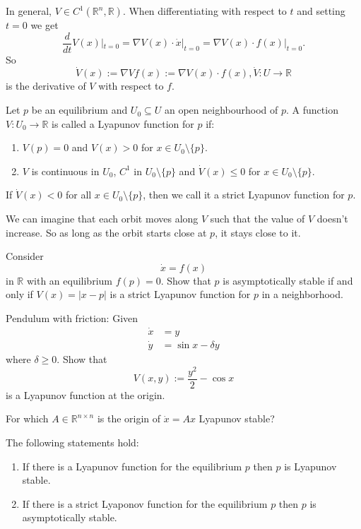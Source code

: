 \documentclass{article}
\newcommand*{\R}{\mathbb{R}}
\newcommand*{\Rn}{{\mathbb{R}^n}}
\newcommand*{\half}[1]{\frac{#1}{2}}
\begin{document}
In general, $V \in C^1(\Rn,\R)$. When differentiating with respect to $t$ and setting $t=0$ we get
$$\frac{d}{dt} V(x)|_{t=0} = \nabla V(x)\cdot \dot x|_{t=0} = \nabla V(x)\cdot f(x)|_{t=0}.$$
So
$$\dot V(x) := \nabla Vf(x) := \nabla V(x)\cdot f(x), \dot V: U\to \R$$
is the derivative of $V$ with respect to $f$.

\begin{defin}
    Let $p$ be an equilibrium and $U_0 \subseteq U$ an open neighbourhood of $p$. A function $V: U_0\to \R$ is called a Lyapunov function for $p$ if:
    \begin{enumerate}
        \item $V(p) = 0$ and $V(x) > 0$ for $x \in U_0\setminus\{p\}$.

        \item $V$ is continuous in $U_0$, $C^1$ in $U_0\setminus \{p\}$ and $\dot V(x)\leq 0$ for $x \in U_0\setminus \{p\}$.
    \end{enumerate}
    If $\dot V(x) < 0$ for all $x\in U_0\setminus\{p\}$, then we call it a strict Lyapunov function for $p$.
\end{defin}

We can imagine that each orbit moves along $V$ such that the value of $V$ doesn't increase. So as long as the orbit starts close at $p$, it stays close to it.

\begin{hw}
    Consider
    $$\dot x = f(x)$$
    in $\R$ with an equilibrium $f(p)=0$. Show that $p$ is asymptotically stable if and only if $V(x) = |x-p|$ is a strict Lyapunov function for $p$ in a neighborhood.
\end{hw}

\begin{hw}
    Pendulum with friction: Given
    $$\begin{aligned}\dot x&=y\\
    \dot y &= \sin x-\delta y\end{aligned}$$
    where $\delta \geq 0$. Show that
    $$V(x,y) := \half{y^2}-\cos x$$
    is a Lyapunov function at the origin.
\end{hw}

\begin{hw}
    For which $A\in\R^{n\times n}$ is the origin of $\dot x = Ax$ Lyapunov stable?
\end{hw}

\begin{thm}[Lyapunov, 1892]
    The following statements hold:
    \begin{enumerate}
        \item If there is a Lyapunov function for the equilibrium $p$ then $p$ is Lyapunov stable.

        \item If there is a strict Lyaponov function for the equilibrium $p$ then $p$ is asymptotically stable.
    \end{enumerate}
\end{thm}
\end{document}
